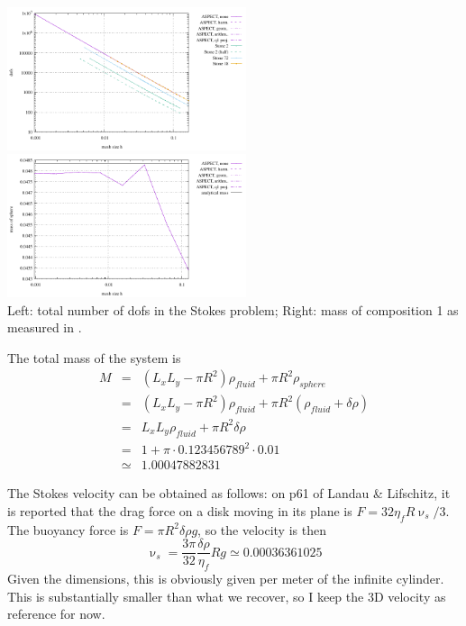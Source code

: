 \begin{center}
\includegraphics[width=7cm]{images/stokes_sphere2D/dofs}
\includegraphics[width=7cm]{images/stokes_sphere2D/mass_sphere}\\
{\captionfont Left: total number of dofs in the Stokes problem; Right: mass of composition 1 
as measured in \aspect.}
\end{center}

The total mass of the system is 
\begin{eqnarray}
M 
&=& (L_xL_y-\pi R^2)\rho_{fluid} + \pi R^2 \rho_{sphere} \\
&=& (L_xL_y-\pi R^2)\rho_{fluid} + \pi R^2 (\rho_{fluid} + \delta\rho)\\
&=& L_xL_y \rho_{fluid} + \pi R^2 \delta\rho\\
&=& 1 + \pi \cdot 0.123456789^2 \cdot 0.01\\
&\simeq& 1.00047882831
\end{eqnarray}

The Stokes velocity can be obtained as follows: on p61 of Landau \& Lifschitz, it is reported that the drag force 
on a disk moving in its plane is $F=32\eta_f R \upnu_s /3$. The buoyancy force is $F=\pi R^2 \delta \rho g$, so the 
velocity is then 
\[
\upnu_s = \frac{3 \pi}{32} \frac{\delta \rho}{\eta_f} R g \simeq 0.00036361025
\]
Given the dimensions, this is obviously given per meter of the infinite cylinder.
This is substantially smaller than what we recover, so I keep the 3D velocity as reference for now.


